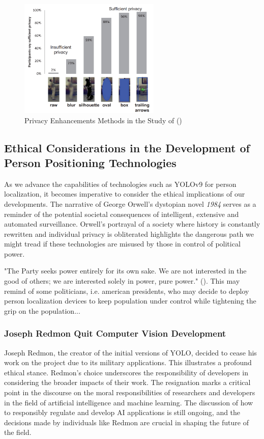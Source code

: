 \begin{figure}[H]
    \centering
    \includegraphics[width=0.6\textwidth]{Images/ed2012results.png}
    \caption{\centering Privacy Enhancements Methods in the Study of \citeauthor{ed2012privacy_review} (\citeyear{ed2012privacy_review})}
    \label{fig:ed_results}
\end{figure}

\subsection{Ethical Considerations in the Development of Person Positioning Technologies}
\label{sec:ethics_localization_tech}

As we advance the capabilities of technologies such as YOLOv9 for person localization, it becomes imperative to consider the ethical implications of our developments. The narrative of George Orwell's dystopian novel \textit{1984} serves as a reminder of the potential societal consequences of intelligent, extensive and automated surveillance. Orwell's portrayal of a society where history is constantly rewritten and individual privacy is obliterated highlights the dangerous path we might tread if these technologies are misused by those in control of political power.

"The Party seeks power entirely for its own sake. We are not interested in the good of others; we are interested solely in power, pure power." (\cite{orwell1984}). This may remind of some politicians, i.e. american presidents, who may decide to deploy person localization devices to keep population under control while tightening the grip on the population...

\subsubsection{Joseph Redmon Quit Computer Vision Development}
Joseph Redmon, the creator of the initial versions of YOLO, decided to cease his work on the project due to its military applications. This illustrates a profound ethical stance. Redmon's choice underscores the responsibility of developers in considering the broader impacts of their work. The resignation marks a critical point in the discourse on the moral responsibilities of researchers and developers in the field of artificial intelligence and machine learning. The discussion of how to responsibly regulate and develop AI applications is still ongoing, and the decisions made by individuals like Redmon are crucial in shaping the future of the field. 

